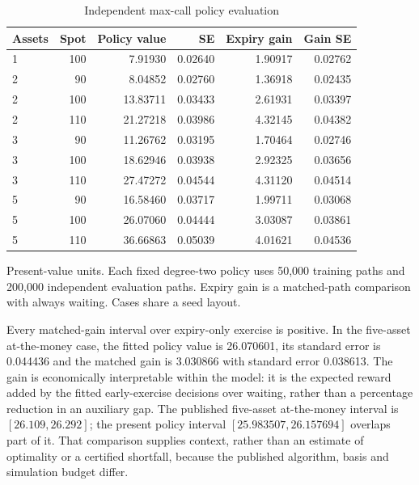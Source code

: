 \documentclass[11pt]{article}
\begin{document}
\begin{table}[!htbp]
\centering\small
\caption{Independent max-call policy evaluation}\label{tab:revision-benchmarks}
\begin{tabular}{@{}lrrrrr@{}}
\toprule
Assets & Spot & Policy value & SE & Expiry gain & Gain SE \\
\midrule
1 & 100 & 7.91930 & 0.02640 & 1.90917 & 0.02762 \\
2 & 90 & 8.04852 & 0.02760 & 1.36918 & 0.02435 \\
2 & 100 & 13.83711 & 0.03433 & 2.61931 & 0.03397 \\
2 & 110 & 21.27218 & 0.03986 & 4.32145 & 0.04382 \\
3 & 90 & 11.26762 & 0.03195 & 1.70464 & 0.02746 \\
3 & 100 & 18.62946 & 0.03938 & 2.92325 & 0.03656 \\
3 & 110 & 27.47272 & 0.04544 & 4.31120 & 0.04514 \\
5 & 90 & 16.58460 & 0.03717 & 1.99711 & 0.03068 \\
5 & 100 & 26.07060 & 0.04444 & 3.03087 & 0.03861 \\
5 & 110 & 36.66863 & 0.05039 & 4.01621 & 0.04536 \\
\bottomrule
\end{tabular}
\par\smallskip\begin{minipage}{\textwidth}\footnotesize Present-value units. Each fixed degree-two policy uses 50,000 training paths and 200,000 independent evaluation paths. Expiry gain is a matched-path comparison with always waiting. Cases share a seed layout.\end{minipage}
\end{table}

Every matched-gain interval over expiry-only exercise is positive. In the five-asset at-the-money case, the fitted policy value is 26.070601, its standard error is 0.044436 and the matched gain is 3.030866 with standard error 0.038613. The gain is economically interpretable within the model: it is the expected reward added by the fitted early-exercise decisions over waiting, rather than a percentage reduction in an auxiliary gap. The published five-asset at-the-money interval is $[26.109,26.292]$; the present policy interval $[25.983507,26.157694]$ overlaps part of it. That comparison supplies context, rather than an estimate of optimality or a certified shortfall, because the published algorithm, basis and simulation budget differ.
\end{document}
